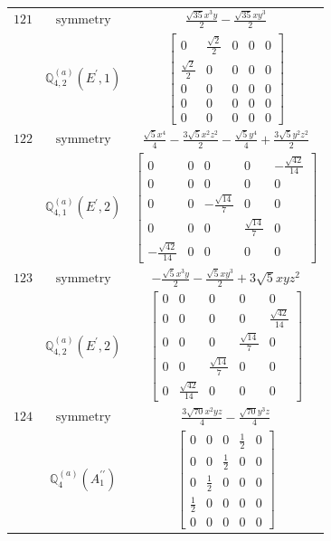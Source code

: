 \documentclass[fleqn,8pt,landscape]{jsarticle}
\begin{document}
\begin{longtable}{ccc}
$ 121 $ & $ \text{symmetry} $ & $ \frac{\sqrt{35} x^{3} y}{2} - \frac{\sqrt{35} x y^{3}}{2} $ \\
$  $ & $ \mathbb{Q}_{4,2}^{(a)}(E^{\prime},1) $ & $ \begin{bmatrix} 0 & \frac{\sqrt{2}}{2} & 0 & 0 & 0 \\ \frac{\sqrt{2}}{2} & 0 & 0 & 0 & 0 \\ 0 & 0 & 0 & 0 & 0 \\ 0 & 0 & 0 & 0 & 0 \\ 0 & 0 & 0 & 0 & 0 \end{bmatrix} $ \\ \hline
$ 122 $ & $ \text{symmetry} $ & $ \frac{\sqrt{5} x^{4}}{4} - \frac{3 \sqrt{5} x^{2} z^{2}}{2} - \frac{\sqrt{5} y^{4}}{4} + \frac{3 \sqrt{5} y^{2} z^{2}}{2} $ \\
$  $ & $ \mathbb{Q}_{4,1}^{(a)}(E^{\prime},2) $ & $ \begin{bmatrix} 0 & 0 & 0 & 0 & - \frac{\sqrt{42}}{14} \\ 0 & 0 & 0 & 0 & 0 \\ 0 & 0 & - \frac{\sqrt{14}}{7} & 0 & 0 \\ 0 & 0 & 0 & \frac{\sqrt{14}}{7} & 0 \\ - \frac{\sqrt{42}}{14} & 0 & 0 & 0 & 0 \end{bmatrix} $ \\ \hline
$ 123 $ & $ \text{symmetry} $ & $ - \frac{\sqrt{5} x^{3} y}{2} - \frac{\sqrt{5} x y^{3}}{2} + 3 \sqrt{5} x y z^{2} $ \\
$  $ & $ \mathbb{Q}_{4,2}^{(a)}(E^{\prime},2) $ & $ \begin{bmatrix} 0 & 0 & 0 & 0 & 0 \\ 0 & 0 & 0 & 0 & \frac{\sqrt{42}}{14} \\ 0 & 0 & 0 & \frac{\sqrt{14}}{7} & 0 \\ 0 & 0 & \frac{\sqrt{14}}{7} & 0 & 0 \\ 0 & \frac{\sqrt{42}}{14} & 0 & 0 & 0 \end{bmatrix} $ \\ \hline
$ 124 $ & $ \text{symmetry} $ & $ \frac{3 \sqrt{70} x^{2} y z}{4} - \frac{\sqrt{70} y^{3} z}{4} $ \\
$  $ & $ \mathbb{Q}_{4}^{(a)}(A_{1}^{\prime\prime}) $ & $ \begin{bmatrix} 0 & 0 & 0 & \frac{1}{2} & 0 \\ 0 & 0 & \frac{1}{2} & 0 & 0 \\ 0 & \frac{1}{2} & 0 & 0 & 0 \\ \frac{1}{2} & 0 & 0 & 0 & 0 \\ 0 & 0 & 0 & 0 & 0 \end{bmatrix} $ \\ \hline

\end{longtable}
\end{document}
